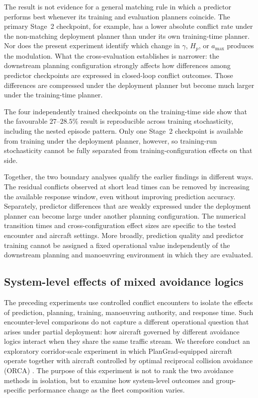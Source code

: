 \documentclass[11pt]{article}
\theoremstyle{plain}
\theoremstyle{definition}
\newcommand{\method}{PlanGrad}
\begin{document}
The result is not evidence for a general matching rule in which a
predictor performs best whenever its training and evaluation planners
coincide. The primary Stage~2 checkpoint, for example, has a lower
absolute conflict rate under the non-matching deployment planner than
under its own training-time planner. Nor does the present experiment
identify which change in $\gamma$, $H_p$, or $a_{\max}$ produces the
modulation. What the cross-evaluation establishes is narrower: the
downstream planning configuration strongly affects how differences
among predictor checkpoints are expressed in closed-loop conflict
outcomes. Those differences are compressed under the deployment
planner but become much larger under the training-time planner.

The four independently trained checkpoints on the training-time side
show that the favourable $27$--$28.5\%$ result is reproducible across
training stochasticity, including the nested episode pattern. Only one
Stage~2 checkpoint is available from training under the deployment
planner, however, so training-run stochasticity cannot be fully
separated from training-configuration effects on that side.

Together, the two boundary analyses qualify the earlier findings in
different ways. The residual conflicts observed at short lead times
can be removed by increasing the available response window, even
without improving prediction accuracy. Separately, predictor
differences that are weakly expressed under the deployment planner can
become large under another planning configuration. The numerical
transition times and cross-configuration effect sizes are specific to
the tested encounter and aircraft settings. More broadly, prediction
quality and predictor training cannot be assigned a fixed operational
value independently of the downstream planning and manoeuvring
environment in which they are evaluated.



\subsection{System-level effects of mixed avoidance logics}
\label{sec:results-corridor}

The preceding experiments use controlled conflict encounters to
isolate the effects of prediction, planning, training, manoeuvring
authority, and response time. Such encounter-level comparisons do not
capture a different operational question that arises under partial
deployment: how aircraft governed by different avoidance logics
interact when they share the same traffic stream. We therefore conduct
an exploratory corridor-scale experiment in which
\method-equipped aircraft operate together with aircraft controlled by
optimal reciprocal collision avoidance (ORCA)
\citep{vandenberg2011reciprocal}. The purpose of this experiment is
not to rank the two avoidance methods in isolation, but to examine how
system-level outcomes and group-specific performance change as the
fleet composition varies.
\end{document}
